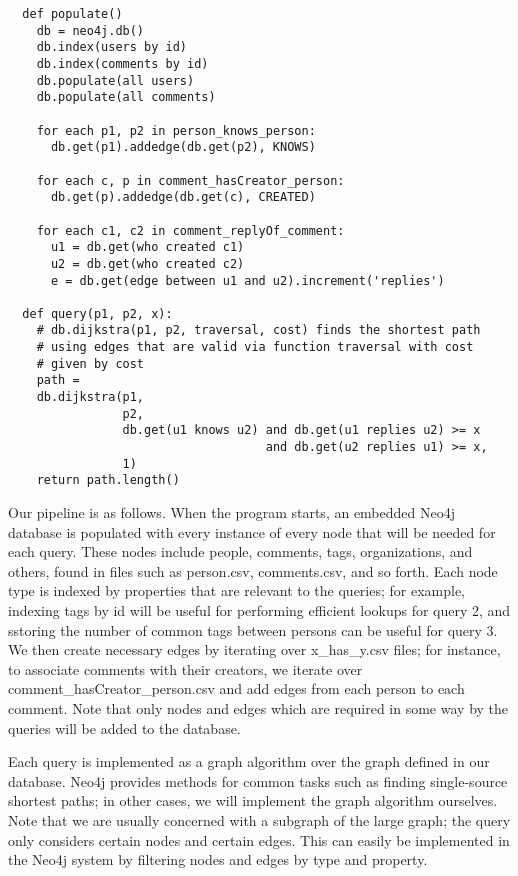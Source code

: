 \documentclass{article}
\begin{document}
\begin{verbatim}
  def populate()
    db = neo4j.db()
    db.index(users by id)
    db.index(comments by id)
    db.populate(all users)
    db.populate(all comments)
    
    for each p1, p2 in person_knows_person:
      db.get(p1).addedge(db.get(p2), KNOWS)
    
    for each c, p in comment_hasCreator_person:
      db.get(p).addedge(db.get(c), CREATED)
    
    for each c1, c2 in comment_replyOf_comment:
      u1 = db.get(who created c1)
      u2 = db.get(who created c2)
      e = db.get(edge between u1 and u2).increment('replies')

  def query(p1, p2, x):
    # db.dijkstra(p1, p2, traversal, cost) finds the shortest path
    # using edges that are valid via function traversal with cost
    # given by cost
    path = 
    db.dijkstra(p1,
                p2,
                db.get(u1 knows u2) and db.get(u1 replies u2) >= x
                                    and db.get(u2 replies u1) >= x,
                1)
    return path.length()
\end{verbatim}


Our pipeline is as follows.  When the program starts, an embedded
Neo4j database is populated with every instance of every node that
will be needed for each query.  These nodes include people, comments,
tags, organizations, and others, found in files such as person.csv,
comments.csv, and so forth.  Each node type is indexed by properties
that are relevant to the queries; for example, indexing tags by id
will be useful for performing efficient lookups for query 2, and
sstoring the number of common tags between persons can be useful for
query 3.  We then create necessary edges by iterating over
x\_has\_y.csv files; for instance, to associate comments with their
creators, we iterate over comment\_hasCreator\_person.csv and add
edges from each person to each comment.  Note that only nodes and
edges which are required in some way by the queries will be added to
the database.

Each query is implemented as a graph algorithm over the graph defined
in our database.  Neo4j provides methods for common tasks such as
finding single-source shortest paths; in other cases, we will
implement the graph algorithm ourselves.  Note that we are usually
concerned with a subgraph of the large graph; the query only considers
certain nodes and certain edges.  This can easily be implemented in
the Neo4j system by filtering nodes and edges by type and property.
\end{document}
